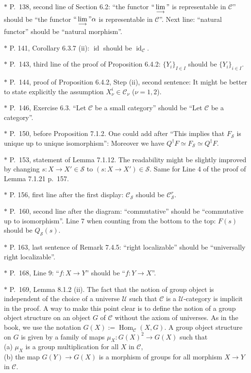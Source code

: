 \documentclass[12pt]{article}%
\theoremstyle{remark}
\theoremstyle{definition}
\newcommand{\cc}{\mathcal}
\newcommand{\C}{\mathcal C}
\newcommand{\SSS}{\mathcal S}
\newcommand{\U}{\mathcal U}
\DeclareMathOperator{\id}{id}
\DeclareMathOperator{\Hom}{Hom}%
\begin{document}
\noindent $*$ P.~138, second line of Section 6.2: ``the functor $``\displaystyle\lim_{\longrightarrow}"$ is representable in $\C$'' should be ``the functor $``\displaystyle\lim_{\longrightarrow}"\alpha$ is representable in $\C$''. Next line: ``natural functor'' should be ``natural morphism''.

\noindent $*$ P. 141, Corollary 6.3.7 (ii): $\id$ should be $\id_\C$.

\noindent $*$ P.~143, third line of the proof of Proposition 6.4.2: $\{Y_i\}_{I\in I}$ should be $\{Y_i\}_{i\in I}$.

\noindent $*$ P.~144, proof of Proposition 6.4.2, Step (ii), second sentence: It might be better to state explicitly the assumption $X_\nu^i\in\C_\nu$ ($\nu=1,2$). 

\noindent $*$ P.~146, Exercise 6.3. ``Let $\C$ be a small category'' should be ``Let $\C$ be a category''.

\noindent $*$ P.~150, before Proposition 7.1.2. One could add after ``This implies that $F_{\SSS}$ is unique up to unique isomorphism'': Moreover we have $Q^\dagger F\simeq F_{\SSS}\simeq Q^\ddagger F$.

\noindent $*$ P.~153, statement of Lemma 7.1.12. The readability might be slightly improved by changing $s:X\to X'\in\mathcal S$ to $(s:X\to X')\in\mathcal S$. Same for Line 4 of the proof of Lemma 7.1.21 p.~157.

\noindent $*$ P. 156, first line after the first display: $\C_{\cc S}$ should be $\C_{\cc S}^r$.

\noindent $*$ P.~160, second line after the diagram: ``commutative'' should be ``commutative up to isomorphism''. Line 7 when counting from the bottom to the top: $F(s)$ should be $Q_{\mathcal S}(s)$.

$*$ P. 163, last sentence of Remark 7.4.5: ``right localizable'' should be ``universally right localizable''.

\noindent $*$ P.~168, Line 9: ``$f:X\to Y$'' should be ``$f:Y\to X$''.

\noindent $*$ P.~169, Lemma 8.1.2 (ii). The fact that the notion of group object is independent of the choice of a universe $\U$ such that $\C$ is a $\U$-category is implicit in the proof. A way to make this point clear is to define the notion of a group object structure on an object $G$ of $\C$ without the axiom of universes. As in the book, we use the notation $G(X):=\Hom_\C(X,G)$. A group object structure on $G$ is given by a family of maps $\mu_X:G(X)^2\to G(X)$ such that\\ 
\noindent(a) $\mu_X$ is a group multiplication for all $X$ in $\C$,\\ 
\noindent(b) the map $G(Y)\to G(X)$ is a morphism of groups for all morphism $X\to Y$ in $\C$.
\end{document}
